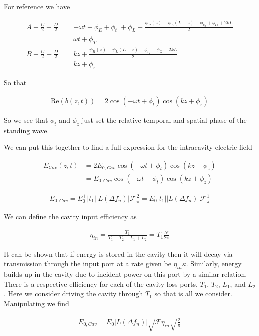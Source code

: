 \documentclass[12pt]{article}
\begin{document}
For reference we have

\begin{align}
A + \frac{C}{2} + \frac{D}{2} &= - \omega t + \phi_E + \phi_{t_1} + \phi_L + \frac{\psi_R(z) + \psi_L(L-z) + \phi_{r_2} + \phi_G + 2 kL}{2}\\
&= \omega t + \phi_T\\
B + \frac{C}{2} - \frac{D}{2} &= kz + \frac{\psi_R(z) - \psi_L(L-z) - \phi_{r_2} - \phi_G - 2 kL}{2}\\
&= kz + \phi_{z}
\end{align}

So that

\begin{align}
\text{Re}(b(z,t)) = 2 \cos(-\omega t + \phi_t)\cos(kz + \phi_z)
\end{align}

So we see that $\phi_t$ and $\phi_z$ just set the relative temporal and spatial phase of the standing wave.

We can put this together to find a full expression for the intracavity electric field

\begin{align}
E_{Cav}(z,t) &= 2E_{0,Cav}^+ \cos\left(-\omega t + \phi_t\right)\cos\left(kz + \phi_z\right)\\
&= E_{0,Cav} \cos\left(-\omega t + \phi_t \right)\cos\left(kz + \phi_z\right)
\end{align}

\begin{align}
E_{0,Cav} = E_0^+ |t_1||L(\Delta f_n)| \mathcal{F} \frac{2}{\pi} = E_0 |t_1||L(\Delta f_n)| \mathcal{F}\frac{1}{\pi}
\end{align}

We can define the cavity input efficiency as

\begin{align}
\eta_{in} = \frac{T_1}{T_1+T_2+L_1+L_2} = T_1 \frac{\mathcal{F}}{2\pi}
\end{align}

It can be shown that if energy is stored in the cavity then it will decay via transmission through the input port at a rate given be $\eta_{in}\kappa$. Similarly, energy builds up in the cavity due to incident power on this port by a similar relation. There is a respective efficiency for each of the cavity loss ports, $T_1$, $T_2$, $L_1$, and $L_2$. Here we consider driving the cavity through $T_1$ so that is all we consider. Manipulating we find

\begin{align}
E_{0,Cav} = E_0 |L(\Delta f_n)| \sqrt{\mathcal{F}\eta_{in}} \sqrt{\frac{2}{\pi}}
\end{align}
\end{document}
